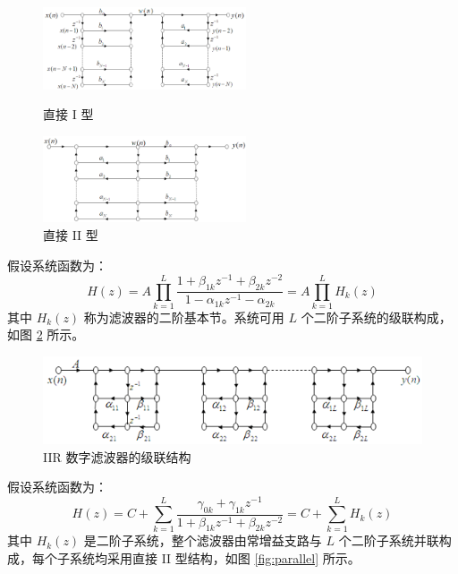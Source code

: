\documentclass[12pt,AutoFakeBold]{article}
\begin{document}
\begin{figure}[htbp]
	\centering
	\begin{minipage}[t]{0.48\textwidth}
		\centering
		\includegraphics[width=6cm]{figure/direct1.png}
		\caption{直接 I 型} \label{fig:direct1}
	\end{minipage}
	\begin{minipage}[t]{0.48\textwidth}
		\centering
		\includegraphics[width=6cm]{figure/direct2.png}
		\caption{直接 II 型} \label{fig:direct2}
	\end{minipage}
\end{figure}


假设系统函数为：
%
\begin{equation}
H(z)=A\prod_{k=1}^{L}\frac{1+\beta_{1k}z^{-1}+\beta_{2k}z^{-2}}{1-\alpha_{1k}z^{-1}-\alpha_{2k}}=A\prod_{k=1}^LH_k(z)
\end{equation}
%
其中 $H_k(z)$ 称为滤波器的二阶基本节。系统可用 $L$ 个二阶子系统的级联构成，如图 \ref{fig:cascade} 所示。

\begin{figure}[hbtp]
	\centering
	\includegraphics[width=16cm]{figure/cascade.png}
	\caption{IIR 数字滤波器的级联结构} \label{fig:cascade}
\end{figure}

假设系统函数为：
%
\begin{equation}
H(z)=C+\sum_{k=1}^L\frac{\gamma_{0k}+\gamma_{1k}z^{-1}}{1+\beta_{1k}z^{-1}+\beta_{2k}z^{-2}}=C+\sum_{k=1}^LH_k(z)
\end{equation}
%
其中 $H_k(z)$ 是二阶子系统，整个滤波器由常增益支路与 $L$ 个二阶子系统并联构成，每个子系统均采用直接 II 型结构，如图 \ref{fig:parallel} 所示。
\end{document}
